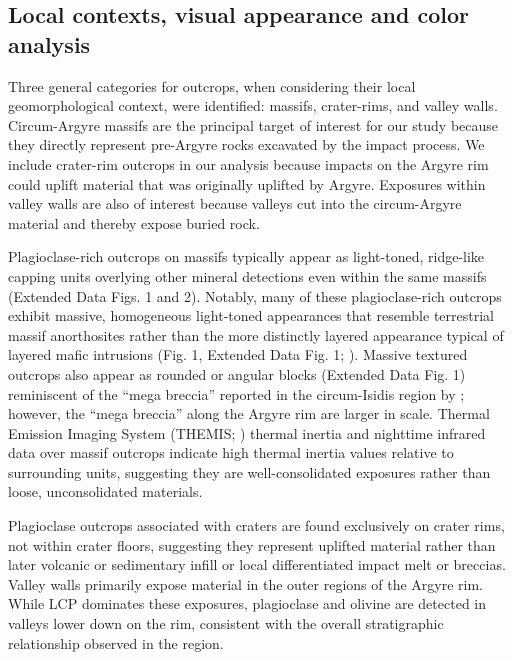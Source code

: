 \documentclass[11pt]{article}
\begin{document}
\subsection*{Local contexts, visual appearance and color analysis}

Three general categories for outcrops, when considering their local geomorphological context, were identified: massifs, crater-rims, and valley walls. Circum-Argyre massifs are the principal target of interest for our study because they directly represent pre-Argyre rocks excavated by the impact process. We include crater-rim outcrops in our analysis because impacts on the Argyre rim could uplift material that was originally uplifted by Argyre. Exposures within valley walls are also of interest because valleys cut into the circum-Argyre material and thereby expose buried rock.

Plagioclase-rich outcrops on massifs typically appear as light-toned, ridge-like capping units overlying other mineral detections even within the same massifs (Extended Data Figs. 1 and 2). Notably, many of these plagioclase-rich outcrops exhibit massive, homogeneous light-toned appearances that resemble terrestrial massif anorthosites rather than the more distinctly layered appearance typical of layered mafic intrusions (Fig. 1, Extended Data Fig. 1; \citealt{Ashwal1993}). Massive textured outcrops also appear as rounded or angular blocks (Extended Data Fig. 1) reminiscent of the ``mega breccia'' reported in the circum-Isidis region by \citet{Scheller2020}; however, the ``mega breccia'' along the Argyre rim are larger in scale. Thermal Emission Imaging System (THEMIS; \citealt{Christensen2004}) thermal inertia \citep{Fergason2006} and nighttime infrared data \citep{Edwards2011} over massif outcrops indicate high thermal inertia values relative to surrounding units, suggesting they are well-consolidated exposures rather than loose, unconsolidated materials.

Plagioclase outcrops associated with craters are found exclusively on crater rims, not within crater floors, suggesting they represent uplifted material rather than later volcanic or sedimentary infill or local differentiated impact melt or breccias. Valley walls primarily expose material in the outer regions of the Argyre rim. While LCP dominates these exposures, plagioclase and olivine are detected in valleys lower down on the rim, consistent with the overall stratigraphic relationship observed in the region.
\end{document}
